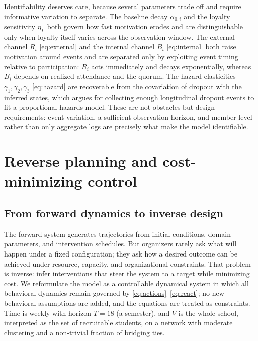 \documentclass[11pt]{article}
\begin{document}
Identifiability deserves care, because several parameters trade off and require informative variation to separate. The baseline decay $\alpha_{0,i}$ and the loyalty sensitivity $\eta_L$ both govern how fast motivation erodes and are distinguishable only when loyalty itself varies across the observation window. The external channel $R_i$ \eqref{eq:external} and the internal channel $B_i$ \eqref{eq:internal} both raise motivation around events and are separated only by exploiting event timing relative to participation: $R_i$ acts immediately and decays exponentially, whereas $B_i$ depends on realized attendance and the quorum. The hazard elasticities $\gamma_1,\gamma_2,\gamma_3$ \eqref{eq:hazard} are recoverable from the covariation of dropout with the inferred states, which argues for collecting enough longitudinal dropout events to fit a proportional-hazards model. These are not obstacles but design requirements: event variation, a sufficient observation horizon, and member-level rather than only aggregate logs are precisely what make the model identifiable.

\section{Reverse planning and cost-minimizing control}\label{sec:control}

\subsection{From forward dynamics to inverse design}
The forward system generates trajectories from initial conditions, domain parameters, and intervention schedules. But organizers rarely ask what will happen under a fixed configuration; they ask how a desired outcome can be achieved under resource, capacity, and organizational constraints. That problem is inverse: infer interventions that steer the system to a target while minimizing cost. We reformulate the model as a controllable dynamical system in which all behavioral dynamics remain governed by \eqref{eq:actions}--\eqref{eq:react}; no new behavioral assumptions are added, and the equations are treated as constraints. Time is weekly with horizon $T=18$ (a semester), and $V$ is the whole school, interpreted as the set of recruitable students, on a network with moderate clustering and a non-trivial fraction of bridging ties.
\end{document}
